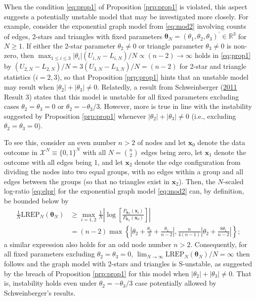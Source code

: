 \documentclass[]{article}
\theoremstyle{definition}
\newcommand{\REP}{\mathrm{LREP}}
\begin{document}
When the condition \eqref{eq:prop1} of Proposition \ref{prp:prop1} is
violated, this aspect suggests a potentially unstable model that may be
investigated more closely. For example, consider the exponential graph
model from \eqref{eq:mod2} involving counts of edges, 2-stars and
triangles with fixed parameters
\(\boldsymbol \theta_N = (\theta_{1},\theta_2,\theta_3)^\prime \in \mathbb{R}^3\)
for \(N\geq 1\). If either the 2-star parameter \(\theta_2 \neq 0\) or
triangle parameter \(\theta_3 \neq 0\) is non-zero, then
\(\max_{1 \leq i \leq 3 } |\theta_{i}|(U_{i,N}-L_{i,N})/N \propto (n-2)\to \infty\)
holds in \eqref{eq:prop1} by
\((U_{2,N}-L_{2,N})/N = 3 (U_{3,N}-L_{3,N})/N=(n-2)\) for 2-star and
triangle statistics (\(i=2,3\)), so that Proposition \ref{prp:prop1}
hints that an unstable model may result when
\(|\theta_2| + |\theta_3| \neq 0\). Relatedly, a result from
Schweinberger
(\protect\hyperlink{ref-schweinberger2011instability}{2011} Result 3)
states that this model is unstable for all fixed parameters excluding
cases \(\theta_2 =\theta_3=0\) or \(\theta_2 = - \theta_3/3\). However,
more is true in line with the instability suggested by Proposition
\ref{prp:prop1} whenever \(|\theta_2| + |\theta_3| \neq 0\) (i.e.,
excluding \(\theta_2 =\theta_3=0\)).

To see this, consider an even number \(n>2\) of nodes and let
\(\boldsymbol x_0\) denote the data outcome in
\(\mathcal{X}^N \equiv \{0,1\}^N\) with all \(N = {n \choose 2}\) edges
being zero, let \(\boldsymbol x_1\) denote the outcome with all edges
being 1, and let \(\boldsymbol x_2\) denote the edge configuration from
dividing the nodes into two equal groups, with no edges within a group
and all edges between the groups (so that no triangles exist in
\(\boldsymbol x_2\)). Then, the \(N\)-scaled log-ratio \eqref{eq:elpr} for
the exponential graph model \eqref{eq:mod2} can, by definition, be bounded
below by
\begin{align*}
\frac{1}{N}\REP_N(\boldsymbol \theta_N) &\geq \max_{i=1,2}\frac{1}{N}
\left| \log\left[ \frac{P_{\boldsymbol \theta_N}(\boldsymbol x_i)}{P_{\boldsymbol \theta_N}(\boldsymbol x_0)}\right] \right| \\
&= (n-2) \max\left\{ \left| \theta_2 + \frac{\theta_3}{3}+\frac{\theta_1}{n-2} \right|, \frac{n}{4(n-1)} \left| \theta_2 + \frac{8\theta_1}{n-2} \right| \right\};
\end{align*}
a similar expression also holds for an odd node number \(n>2\).
Consequently, for all fixed parameters excluding
\(\theta_2=\theta_3=0\),
\(\lim_{N\to \infty}\REP_N(\boldsymbol \theta_N)/N=\infty\) then follows
and the graph model with 2-stars and triangles is S-unstable, as
suggested by the breach of Proposition \ref{prp:prop1} for this model
when \(|\theta_2|+|\theta_3|\neq 0\). That is, instability holds even
under \(\theta_2 = - \theta_3/3\) case potentially allowed by
Schweinberger's results.
\end{document}
